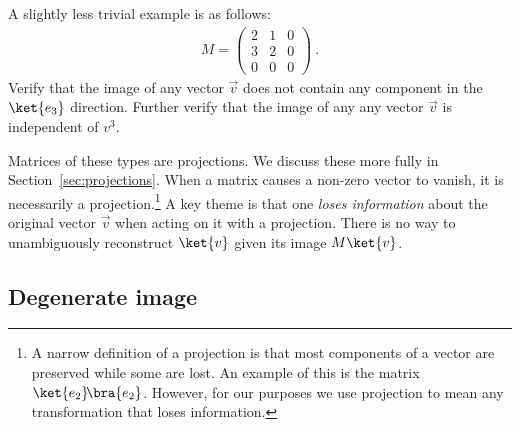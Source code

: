 \begin{exercise}
A slightly less trivial example is as follows:
\begin{align}
    M = 
    \begin{pmatrix}
        2 & 1 & 0 \\
        3 & 2 & 0 \\
        0 & 0 & 0
    \end{pmatrix} \ .
\end{align}
Verify that the image of any vector $\vec{v}$ does not contain any component in the $\ket{e_3}$ direction. Further verify that the image of any any vector $\vec{v}$ is independent of $v^3$.
\end{exercise}

Matrices of these types are projections. We discuss these more fully in Section~\ref{sec:projections}. When a matrix causes a non-zero vector to vanish, it is necessarily a projection.\footnote{A narrow definition of a projection is that most components of a vector are preserved while some are lost. An example of this is the matrix $\ket{e_2}\!\bra{e_2}$. However, for our purposes we use projection to mean any transformation that loses information.} A key theme is that one \emph{loses information} about the original vector $\vec{v}$ when acting on it with a projection. There is no way to unambiguously reconstruct $\ket{v}$ given its image $M\ket{v}$.



\subsection{Degenerate image}

